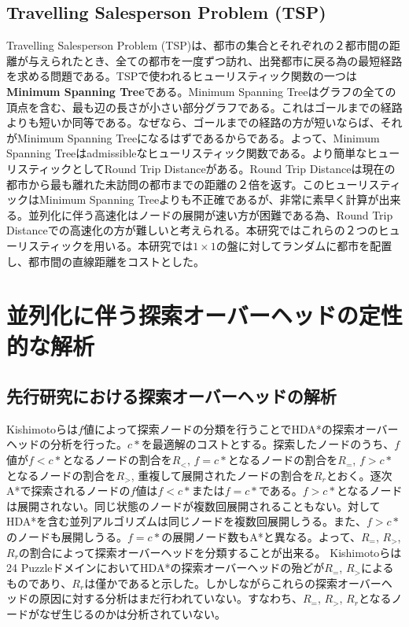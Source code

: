 \documentclass[uplatex]{jsarticle}
\begin{document}
\subsection{Travelling Salesperson Problem (TSP)}
Travelling Salesperson Problem (TSP)は、都市の集合とそれぞれの２都市間の距離が与えられたとき、全ての都市を一度ずつ訪れ、出発都市に戻る為の最短経路を求める問題である。TSPで使われるヒューリスティック関数の一つは\textbf{Minimum Spanning Tree}である。Minimum Spanning Treeはグラフの全ての頂点を含む、最も辺の長さが小さい部分グラフである。これはゴールまでの経路よりも短いか同等である。なぜなら、ゴールまでの経路の方が短いならば、それがMinimum Spanning Treeになるはずであるからである。よって、Minimum Spanning Treeはadmissibleなヒューリスティック関数である。より簡単なヒューリスティックとしてRound Trip Distanceがある。Round Trip Distanceは現在の都市から最も離れた未訪問の都市までの距離の２倍を返す。このヒューリスティックはMinimum Spanning Treeよりも不正確であるが、非常に素早く計算が出来る。並列化に伴う高速化はノードの展開が速い方が困難である為、Round Trip Distanceでの高速化の方が難しいと考えられる。本研究ではこれらの２つのヒューリスティックを用いる。本研究では$1\times1$の盤に対してランダムに都市を配置し、都市間の直線距離をコストとした。

\section{並列化に伴う探索オーバーヘッドの定性的な解析}
\label{sec:analysis1}

\subsection{先行研究における探索オーバーヘッドの解析}
Kishimotoらは$f$値によって探索ノードの分類を行うことでHDA*の探索オーバーヘッドの分析を行った\cite{Kishimoto2013}。$c*$を最適解のコストとする。探索したノードのうち、$f$値が$f < c*$となるノードの割合を$R_{<}$, $f = c*$となるノードの割合を$R_{=}$, $f > c*$となるノードの割合を$R_{>}$, 重複して展開されたノードの割合を$R_{r}$とおく。逐次A*で探索されるノードの$f$値は$f < c*$または$f = c*$である。$f > c*$となるノードは展開されない。同じ状態のノードが複数回展開されることもない。対してHDA*を含む並列アルゴリズムは同じノードを複数回展開しうる。また、$f > c*$のノードも展開しうる。$f = c*$の展開ノード数もA*と異なる。よって、$R_{=}$, $R_{>}$, $R_{r}$の割合によって探索オーバーヘッドを分類することが出来る。
Kishimotoらは24 PuzzleドメインにおいてHDA*の探索オーバーヘッドの殆どが$R_{=}$, $R_{>}$によるものであり、$R_{r}$は僅かであると示した。しかしながらこれらの探索オーバーヘッドの原因に対する分析はまだ行われていない。すなわち、$R_{=}$, $R_{>}$, $R_{r}$となるノードがなぜ生じるのかは分析されていない。
\end{document}
